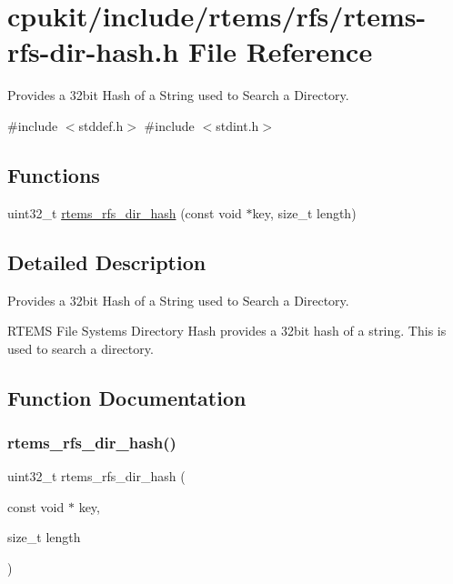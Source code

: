 \hypertarget{rtems-rfs-dir-hash_8h}{}\section{cpukit/include/rtems/rfs/rtems-\/rfs-\/dir-\/hash.h File Reference}
\label{rtems-rfs-dir-hash_8h}


Provides a 32bit Hash of a String used to Search a Directory.  


{\ttfamily \#include $<$stddef.\+h$>$}\newline
{\ttfamily \#include $<$stdint.\+h$>$}\newline
\subsection*{Functions}
\begin{DoxyCompactItemize}
\item 
uint32\+\_\+t \mbox{\hyperlink{rtems-rfs-dir-hash_8h_a9a48bb16458d3a175e425382193e75f3}{rtems\+\_\+rfs\+\_\+dir\+\_\+hash}} (const void $\ast$key, size\+\_\+t length)
\end{DoxyCompactItemize}


\subsection{Detailed Description}
Provides a 32bit Hash of a String used to Search a Directory. 

R\+T\+E\+MS File Systems Directory Hash provides a 32bit hash of a string. This is used to search a directory. 

\subsection{Function Documentation}
\mbox{\label{rtems-rfs-dir-hash_8h_a9a48bb16458d3a175e425382193e75f3}} 
\subsubsection{\texorpdfstring{rtems\_rfs\_dir\_hash()}{rtems\_rfs\_dir\_hash()}}
{\footnotesize\ttfamily uint32\+\_\+t rtems\+\_\+rfs\+\_\+dir\+\_\+hash (\begin{DoxyParamCaption}\item[{const void $\ast$}]{key,  }\item[{size\+\_\+t}]{length }\end{DoxyParamCaption})}

